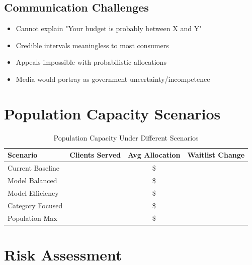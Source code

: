 \subsection{Communication Challenges}

\begin{itemize}
    \item Cannot explain "Your budget is probably between X and Y"
    \item Credible intervals meaningless to most consumers
    \item Appeals impossible with probabilistic allocations
    \item Media would portray as government uncertainty/incompetence
\end{itemize}

\section{Population Capacity Scenarios}

\begin{table}[h]
\centering
\caption{Population Capacity Under Different Scenarios}
\begin{tabular}{lccc}
\toprule
\textbf{Scenario} & \textbf{Clients Served} & \textbf{Avg Allocation} & \textbf{Waitlist Change} \\
\midrule
Current Baseline & \ModelEightPopcurrentbaselineClients{} & \$\ModelEightPopcurrentbaselineAvgAlloc{} & \ModelEightPopcurrentbaselineWaitlistChange{} \\
Model Balanced & \ModelEightPopmodelbalancedClients{} & \$\ModelEightPopmodelbalancedAvgAlloc{} & \ModelEightPopmodelbalancedWaitlistChange{} \\
Model Efficiency & \ModelEightPopmodelefficiencyClients{} & \$\ModelEightPopmodelefficiencyAvgAlloc{} & \ModelEightPopmodelefficiencyWaitlistChange{} \\
Category Focused & \ModelEightPopcategoryfocusedClients{} & \$\ModelEightPopcategoryfocusedAvgAlloc{} & \ModelEightPopcategoryfocusedWaitlistChange{} \\
Population Max & \ModelEightPoppopulationmaximizedClients{} & \$\ModelEightPoppopulationmaximizedAvgAlloc{} & \ModelEightPoppopulationmaximizedWaitlistChange{} \\
\bottomrule
\end{tabular}
\end{table}

\section{Risk Assessment}

